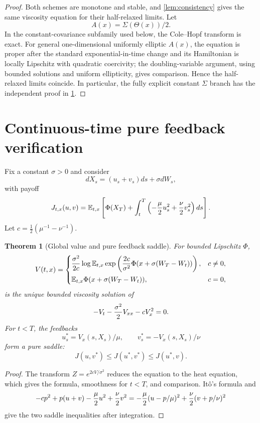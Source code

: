 \documentclass[11pt,reqno]{amsart}
\newtheorem{theorem}{Theorem}[section]
\theoremstyle{definition}
\theoremstyle{remark}
\newcommand{\E}{\mathbb E}
\begin{document}
\begin{proof}
Both schemes are monotone and stable, and \cref{lem:consistency} gives the same
viscosity equation for their half-relaxed limits.  Let
\[
 A(x)=\Sigma(\Theta(x))/2.
\]
In the constant-covariance subfamily used below, the Cole--Hopf transform is
exact.  For general one-dimensional uniformly elliptic $A(x)$, the equation is
proper after the standard exponential-in-time change and its Hamiltonian is
locally Lipschitz with quadratic coercivity; the doubling-variable argument,
using bounded solutions and uniform ellipticity, gives comparison.  Hence the
half-relaxed limits coincide.  In particular, the fully explicit constant
$\Sigma$ branch has the independent proof in \cref{thm:feedback}.
\end{proof}

\section{Continuous-time pure feedback verification}\label{sec:feedback}
Fix a constant $\sigma>0$ and consider
\[
 dX_s=(u_s+v_s)ds+\sigma dW_s,
\]
with payoff
\[
 J_{t,x}(u,v)=\E_{t,x}\left[
 \Phi(X_T)+\int_t^T
 \left(-{\mu\over2}u_s^2+{\nu\over2}v_s^2\right)ds\right].
\]
Let $c=\frac12(\mu^{-1}-\nu^{-1})$.

\begin{theorem}[Global value and pure feedback saddle]\label{thm:feedback}
For bounded Lipschitz $\Phi$,
\[
 V(t,x)=
 \begin{cases}
 \displaystyle {\sigma^2\over2c}
 \log\E_{t,x}\exp\left({2c\over\sigma^2}
 \Phi(x+\sigma(W_T-W_t))\right),&c\ne0,\\[2ex]
 \E_{t,x}\Phi(x+\sigma(W_T-W_t)),&c=0,
 \end{cases}
\]
is the unique bounded viscosity solution of
\[
 -V_t-{\sigma^2\over2}V_{xx}-cV_x^2=0.
\]
For $t<T$, the feedbacks
\[
 u_s^*=V_x(s,X_s)/\mu,
 \qquad v_s^*=-V_x(s,X_s)/\nu
\]
form a pure saddle:
\[
 J(u,v^*)\le J(u^*,v^*)\le J(u^*,v).
\]
\end{theorem}

\begin{proof}
The transform $Z=e^{2cV/\sigma^2}$ reduces the equation to the heat equation,
which gives the formula, smoothness for $t<T$, and comparison.  It\^o's formula
and
\[
 -cp^2+p(u+v)-{\mu\over2}u^2+{\nu\over2}v^2
 =-{\mu\over2}(u-p/\mu)^2
 +{\nu\over2}(v+p/\nu)^2
\]
give the two saddle inequalities after integration.
\end{proof}
\end{document}
